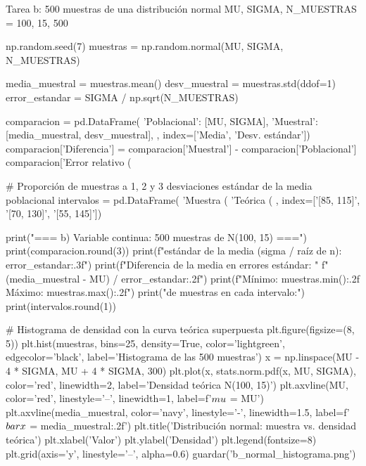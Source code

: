 \documentclass[11pt,letterpaper]{article}
\begin{document}
\begin{codigo}[label=cod:b]{Tarea b: 500 muestras de una distribución normal}
MU, SIGMA, N_MUESTRAS = 100, 15, 500

np.random.seed(7)
muestras = np.random.normal(MU, SIGMA, N_MUESTRAS)

media_muestral = muestras.mean()
desv_muestral = muestras.std(ddof=1)
error_estandar = SIGMA / np.sqrt(N_MUESTRAS)

comparacion = pd.DataFrame({
    'Poblacional': [MU, SIGMA],
    'Muestral': [media_muestral, desv_muestral],
}, index=['Media', 'Desv. estándar'])
comparacion['Diferencia'] = comparacion['Muestral'] - comparacion['Poblacional']
comparacion['Error relativo (%

# Proporción de muestras a 1, 2 y 3 desviaciones estándar de la media poblacional
intervalos = pd.DataFrame({
    'Muestra (%
    'Teórica (%
}, index=['[85, 115]', '[70, 130]', '[55, 145]'])

print("\n=== b) Variable continua: 500 muestras de N(100, 15) ===")
print(comparacion.round(3))
print(f"\nError estándar de la media (sigma / raíz de n): {error_estandar:.3f}")
print(f"Diferencia de la media en errores estándar: "
      f"{(media_muestral - MU) / error_estandar:.2f}")
print(f"Mínimo: {muestras.min():.2f}   Máximo: {muestras.max():.2f}")
print(" de muestras en cada intervalo:")
print(intervalos.round(1))

# Histograma de densidad con la curva teórica superpuesta
plt.figure(figsize=(8, 5))
plt.hist(muestras, bins=25, density=True, color='lightgreen', edgecolor='black',
         label='Histograma de las 500 muestras')
x = np.linspace(MU - 4 * SIGMA, MU + 4 * SIGMA, 300)
plt.plot(x, stats.norm.pdf(x, MU, SIGMA), color='red', linewidth=2,
         label='Densidad teórica N(100, 15)')
plt.axvline(MU, color='red', linestyle='--', linewidth=1, label=f'$\\mu$ = {MU}')
plt.axvline(media_muestral, color='navy', linestyle='-', linewidth=1.5,
            label=f'$\\bar{{x}}$ = {media_muestral:.2f}')
plt.title('Distribución normal: muestra vs. densidad teórica')
plt.xlabel('Valor')
plt.ylabel('Densidad')
plt.legend(fontsize=8)
plt.grid(axis='y', linestyle='--', alpha=0.6)
guardar('b_normal_histograma.png')
\end{codigo}
\end{document}
